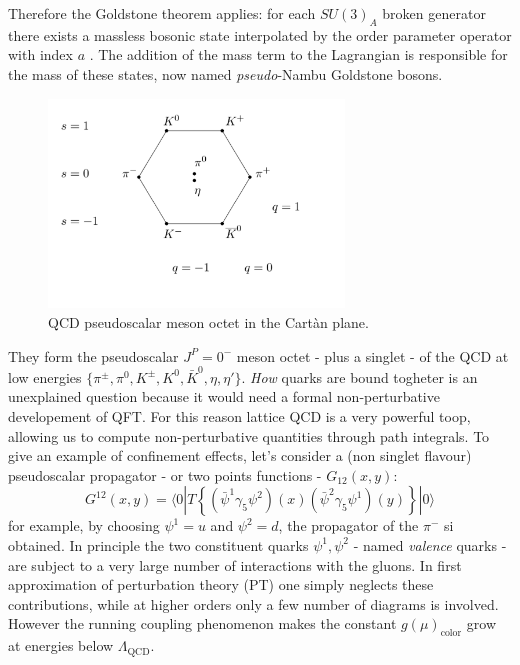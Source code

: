 \documentclass[english, LaM, oneside, noexaminfo]{sapthesis}
\newcommand{\la}{\langle}
\newcommand{\ra}{\rangle}
\begin{document}
Therefore the Goldstone theorem applies: for each $SU(3)_A$ broken generator there exists a massless bosonic state interpolated by the order parameter operator with index $a$ \cite{Goldstone-Theorem}.
The addition of the mass term to the Lagrangian is responsible for the mass of these states, now named {\it pseudo}-Nambu Goldstone bosons.
\begin{figure}[!h]
    \centering
    \includegraphics[width=0.7\textwidth]{imgs-MSc-thesis/ottuplice_via.pdf}
    \caption{QCD pseudoscalar meson octet in the Cartàn plane.}
    \label{fig:meson_octet}
\end{figure}
\newline
They form the pseudoscalar $J^P = 0^-$ meson octet - plus a singlet - of the QCD at low energies $\{ \pi^\pm,\pi^0,K^\pm,K^0,\bar K^0,\eta,\eta' \}$.
\textit{How} quarks are bound togheter is an unexplained question because it would need a formal non-perturbative developement of QFT.
For this reason lattice QCD is a very powerful toop, allowing us to compute non-perturbative quantities through path integrals.
\newline
To give an example of confinement effects, let's consider a (non singlet flavour) pseudoscalar propagator - or two points functions - $G_{12}(x,y)$:
\begin{equation*}
    G^{12}(x,y) = \la 0 | T \left\{ ( \bar\psi^1 \gamma_5 \psi^2 )(x) ( \bar\psi^2 \gamma_5 \psi^1 )(y) \right\} | 0 \ra
\end{equation*}
for example, by choosing $\psi^1 = u$ and $\psi^2 = d$, the propagator of the $\pi^-$ si obtained.
In principle the two constituent quarks $\psi^1, \psi^2$ - named \textit{valence} quarks - are subject to a very large number of interactions with the gluons.
In first approximation of perturbation theory (PT) one simply neglects these contributions, while at higher orders only a few number of diagrams is involved.
However the running coupling phenomenon makes the constant $g(\mu)_\text{color}$ grow at energies below $\Lambda_\text{QCD}$. 
\end{document}
